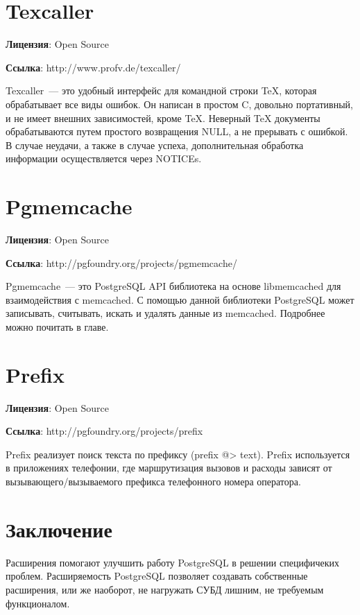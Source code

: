\section{Texcaller}
\textbf{Лицензия}: Open Source

\textbf{Ссылка}: http://www.profv.de/texcaller/

Texcaller~--- это удобный интерфейс для командной строки TeX, которая обрабатывает все виды ошибок. Он написан в простом C, довольно портативный, 
и не имеет внешних зависимостей, кроме TeX. Неверный TeX документы обрабатываются путем простого возвращения NULL, 
а не прерывать с ошибкой. В случае неудачи, а также в случае успеха, дополнительная обработка информации осуществляется через NOTICEs.

\section{Pgmemcache}
\textbf{Лицензия}: Open Source

\textbf{Ссылка}: http://pgfoundry.org/projects/pgmemcache/

Pgmemcache~--- это PostgreSQL API библиотека на основе libmemcached для взаимодействия с memcached. С помощью данной библиотеки 
PostgreSQL может записывать, считывать, искать и удалять данные из memcached. Подробнее можно почитать в  главе.

\section{Prefix}
\textbf{Лицензия}: Open Source

\textbf{Ссылка}: http://pgfoundry.org/projects/prefix

Prefix реализует поиск текста по префиксу (prefix @> text). 
Prefix используется в приложениях телефонии, где маршрутизация вызовов и расходы зависят от 
вызывающего/вызываемого префикса телефонного номера оператора.

\section{Заключение}
Расширения помогают улучшить работу PostgreSQL в решении специфичеких проблем. Расширяемость PostgreSQL позволяет создавать собственные расширения, 
или же наоборот, не нагружать СУБД лишним, не требуемым функционалом.